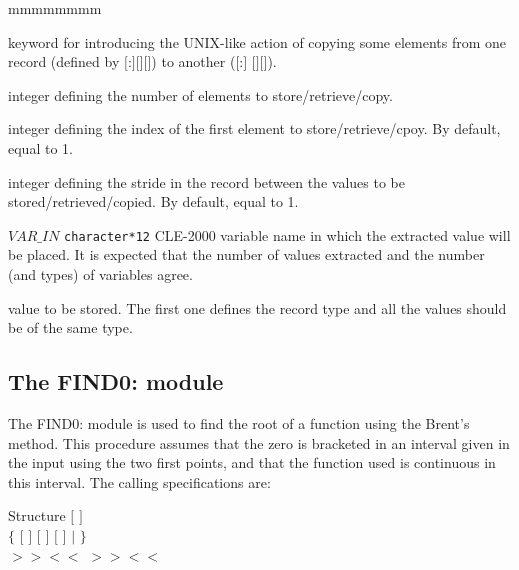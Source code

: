 \begin{ListeDeDescription}{mmmmmmmm}
\item[\moc{CP}] keyword for introducing the UNIX-like action of copying some elements from one record (defined by $[$:$]$$[$$]$$[$$]$) to another ($[$:$]$  $[$$]$$[$$]$).

\item[\dusa{nbelem}] integer defining the number of elements to store/retrieve/copy.

\item[\dusa{indexfirst}] integer defining the index of the first element to store/retrieve/cpoy. By default, equal to 1.

\item[\dusa{increment}] integer defining the stride in the record between the values to be stored/retrieved/copied. By default, equal to 1.

\item[$VAR\_IN$] {\tt character*12} CLE-2000 variable name in which the extracted value will be placed. It is expected that the number of values extracted and the number (and types) of variables agree.

\item[\dusa{value}] value to be stored. The first one defines the record type and all the values should be of the same type.

\end{ListeDeDescription}

\clearpage

\subsection{The FIND0: module}\label{sect:FIND0Data}

The FIND0: module is used to find the root of a function using the  Brent's
method.  This procedure assumes that the zero is bracketed in an interval given
in the input using the two first points, and that the function used is continuous
in this interval. The calling specifications are:

\begin{DataStructure}{Structure }
 \moc{:=}  $[$  $]$ \moc{::} \\
$\{$ $[$  $]$  $[$   $]$
                          $[$   $]$
    
    
$|$   $\}$ \\
$>>$$<<$ $>>$$<<$ \moc{;}
\end{DataStructure}

